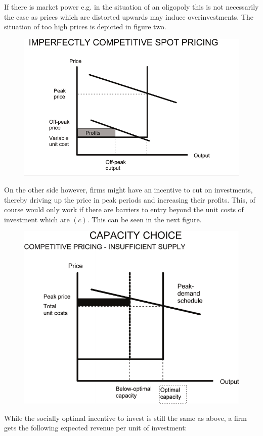If there is market power e.g. in the situation of an oligopoly this is not necessarily the case as prices which are distorted upwards may induce overinvestments. The situation of too high prices is depicted in figure two. 

\begin{figure}[h]
\centering
\includegraphics[width=.7\textwidth]{capacity/peak_load_toohigh}

      \label{von der Fehr and Harbord 1997}            
\end{figure}

On the other side however, firms might have an incentive to cut on investments, thereby driving up the price in peak periods and increasing their profits. This, of course would only work if there are barriers to entry beyond the unit costs of investment which are $(c)$. This can be seen in the next figure.

\begin{figure}[h]
\centering
\includegraphics[width=.7\textwidth]{capacity/peak_load_insufficient}

      \label{von der Fehr and Harbord 1997}            
\end{figure}

While the socially optimal incentive to invest is still the same as above, a firm gets the following expected revenue per unit of investment:

